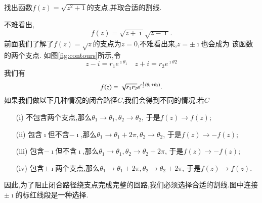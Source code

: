 \begin{example}
找出函数$f(z) = \sqrt{z^2 + 1}$的支点,并取合适的割线.
\end{example}
\begin{solution}
不难看出,
\[
  f(z) = \sqrt{z + \imath} \sqrt{z-\imath} .
\]
前面我们了解了$f(z)=\sqrt{z}$的支点为$z=0$,不难看出来,$z=\pm \imath$也会成为
该函数的两个支点.
如图\ref{fig:contours}所示,令
\[ z - i = r_1 e^{\imath \theta_1 } \quad 
    z + i = r_2 e^{\imath \theta 2}
\]
我们有\[f(z) = \sqrt{r_1 r_2} e^{\imath {\frac{1}{2}} (\theta_1 + \theta_2)}.\]
如果我们做以下几种情况的闭合路径$C$,我们会得到不同的情况.若$C$
\begin{enumerate}
    \item[(i)] 不包含两个支点,那么$\theta_1 \to \theta_1, \theta_2 \to \theta_2$, 于是$f(z)\to f(z)$;
    \item[(ii)] 包含$\imath$但不含$-\imath$,那么$\theta_1 \to \theta_1 + 2\pi, \theta_2 \to \theta_2$, 于是$f(z)\to - f(z)$;
    \item[(iii)] 包含$-\imath$但不含$\imath$,那么$\theta_1 \to \theta_1, \theta_2 \to \theta_2  + 2\pi$, 于是$f(z)\to - f(z)$;
    \item[(iv)] 包含$\pm \imath$两个支点,那么$\theta_1 \to \theta_1  + 2\pi, \theta_2 \to \theta_2  + 2\pi$, 于是$f(z)\to  f(z)$.
\end{enumerate}
因此,为了阻止闭合路径绕支点完成完整的回路,我们必须选择合适的割线.图中连接$\pm \imath$的标红线段是一种选择.
\end{solution}